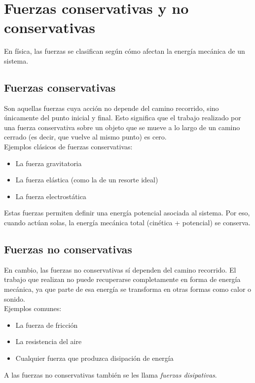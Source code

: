 \section{Fuerzas conservativas y no conservativas}
En física, las fuerzas se clasifican según cómo afectan la energía mecánica de un sistema. 

\subsection{Fuerzas conservativas}
Son aquellas fuerzas cuya acción no depende del camino recorrido, sino únicamente del punto inicial y final. Esto significa que el trabajo realizado por una fuerza conservativa sobre un objeto que se mueve a lo largo de un camino cerrado (es decir, que vuelve al mismo punto) es cero. \\[.35cm]

Ejemplos clásicos de fuerzas conservativas:

\begin{itemize}
    \item La fuerza gravitatoria
    \item La fuerza elástica (como la de un resorte ideal)
    \item La fuerza electrostática
\end{itemize}

Estas fuerzas permiten definir una energía potencial asociada al sistema. Por eso, cuando actúan solas, la energía mecánica total (cinética + potencial) se conserva.

\subsection{Fuerzas no conservativas}
En cambio, las fuerzas no conservativas sí dependen del camino recorrido. El trabajo que realizan no puede recuperarse completamente en forma de energía mecánica, ya que parte de esa energía se transforma en otras formas como calor o sonido. \\[.35cm]

Ejemplos comunes:

\begin{itemize}
    \item La fuerza de fricción
    \item La resistencia del aire
    \item Cualquier fuerza que produzca disipación de energía
\end{itemize}
 A las fuerzas no conservativas tambi\'en se les llama \textit{fuerzas disipativas}.
 
